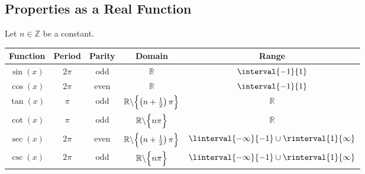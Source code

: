 \documentclass{article}
\begin{document}
\subsection{Properties as a Real Function}
Let \(n\in\mathbb{Z}\) be a constant.
\begin{table}[H]
    \centering
    \begin{tabular}{c|cc|cc}
        \toprule
        \textbf{Function}          & \textbf{Period} & \textbf{Parity} & \textbf{Domain}                                                           & \textbf{Range}                                         \\
        \midrule
        \(\sin{\left( x \right)}\) & \(2\pi\)        & odd             & \(\mathbb{R}\)                                                            & \(\interval{-1}{1}\)                                   \\
        \(\cos{\left( x \right)}\) & \(2\pi\)        & even            & \(\mathbb{R}\)                                                            & \(\interval{-1}{1}\)                                   \\
        \(\tan{\left( x \right)}\) & \(\pi\)         & odd             & \(\mathbb{R}\backslash\Bigl\{ \left( n + \frac{1}{2} \right)\pi \Bigr\}\) & \(\mathbb{R}\)                                         \\
        \(\cot{\left( x \right)}\) & \(\pi\)         & odd             & \(\mathbb{R}\backslash\Bigl\{ n\pi \Bigr\}\)                              & \(\mathbb{R}\)                                         \\
        \(\sec{\left( x \right)}\) & \(2\pi\)        & even            & \(\mathbb{R}\backslash\Bigl\{ \left( n + \frac{1}{2} \right)\pi \Bigr\}\) & \(\linterval{-\infty}{-1} \cup \rinterval{1}{\infty}\) \\
        \(\csc{\left( x \right)}\) & \(2\pi\)        & odd             & \(\mathbb{R}\backslash\Bigl\{ n\pi \Bigr\}\)                              & \(\linterval{-\infty}{-1} \cup \rinterval{1}{\infty}\) \\
        \bottomrule
    \end{tabular}
\end{table}
\end{document}
